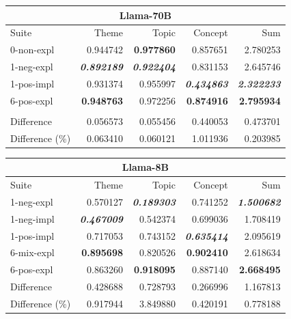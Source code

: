 \begin{table}
    \centering
    \tiny
    \begin{tabular}{lrrrr}
    \toprule
    \multicolumn{5}{c}{\textbf{Llama-70B}} \\
    \midrule
    Suite & Theme & Topic & Concept & Sum \\
    0-non-expl & 0.944742 & \bfseries 0.977860 & 0.857651 & 2.780253 \\
    1-neg-expl & \bfseries \itshape 0.892189 & \bfseries \itshape 0.922404 & 0.831153 & 2.645746 \\
    1-pos-impl & 0.931374 & 0.955997 & \bfseries \itshape 0.434863 & \bfseries \itshape 2.322233 \\
    6-pos-expl & \bfseries 0.948763 & 0.972256 & \bfseries 0.874916 & \bfseries 2.795934 \\
    & & & & \\
    \midrule
    Difference & 0.056573 & 0.055456 & 0.440053 & 0.473701 \\
    Difference (\%) & 0.063410 & 0.060121 & 1.011936 & 0.203985 \\
    \bottomrule
    \end{tabular}
    \quad %
    \begin{tabular}{lrrrr}
    \toprule
    \multicolumn{5}{c}{\textbf{Llama-8B}} \\
    \midrule
    Suite & Theme & Topic & Concept & Sum \\
    1-neg-expl & 0.570127 & \bfseries \itshape 0.189303 & 0.741252 & \bfseries \itshape 1.500682 \\
    1-neg-impl & \bfseries \itshape 0.467009 & 0.542374 & 0.699036 & 1.708419 \\
    1-pos-impl & 0.717053 & 0.743152 & \bfseries \itshape 0.635414 & 2.095619 \\
    6-mix-expl & \bfseries 0.895698 & 0.820526 & \bfseries 0.902410 & 2.618634 \\
    6-pos-expl & 0.863260 & \bfseries 0.918095 & 0.887140 & \bfseries 2.668495 \\
    \midrule
    Difference & 0.428688 & 0.728793 & 0.266996 & 1.167813 \\
    Difference (\%) & 0.917944 & 3.849880 & 0.420191 & 0.778188 \\
    \bottomrule
    \end{tabular}


\end{table}

